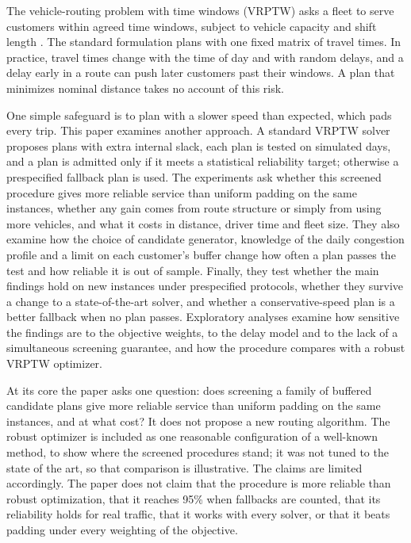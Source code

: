 \documentclass[11pt,a4paper]{article}
\begin{document}
The vehicle-routing problem with time windows (VRPTW) asks a fleet to serve
customers within agreed time windows, subject to vehicle capacity and shift
length \cite{solomon1987,toth2014}. The standard formulation plans with one fixed
matrix of travel times. In practice, travel times change with the time of day and
with random delays, and a delay early in a route can push later customers past
their windows. A plan that minimizes nominal distance takes no account
of this risk.

One simple safeguard is to plan with a slower speed than expected, which pads
every trip. This paper examines another approach. A standard VRPTW solver proposes
plans with extra internal slack, each plan is tested on simulated days, and a plan
is admitted only if it meets a statistical reliability target; otherwise a
prespecified fallback plan is used. The experiments ask
whether this screened procedure gives more reliable service than uniform padding
on the same instances, whether any gain comes from route structure or simply from
using more vehicles, and what it costs in distance, driver time and fleet size.
They also examine how the choice of candidate generator, knowledge of the daily
congestion profile and a limit on each customer's buffer change how often a plan
passes the test and how reliable it is out of sample. Finally, they test whether
the main findings hold on new instances under prespecified protocols, whether
they survive a change to a state-of-the-art solver, and whether a
conservative-speed plan is a better fallback when no plan passes. Exploratory
analyses examine how sensitive the findings are to the objective weights, to the
delay model and to the lack of a simultaneous screening guarantee, and how the
procedure compares with a robust VRPTW optimizer.

At its core the paper asks one question: does screening a family of buffered
candidate plans give more reliable service than uniform padding on the same
instances, and at what cost? It does not propose a new routing algorithm.
The robust optimizer is included as one reasonable configuration of a well-known
method, to show where the screened procedures stand; it was not tuned to the
state of the art, so that comparison is illustrative. The claims are limited
accordingly. The paper does not claim that the procedure is more reliable than
robust optimization, that it reaches 95\% when fallbacks are counted, that its
reliability holds for real traffic, that it works with every solver, or that it
beats padding under every weighting of the objective.
\end{document}
